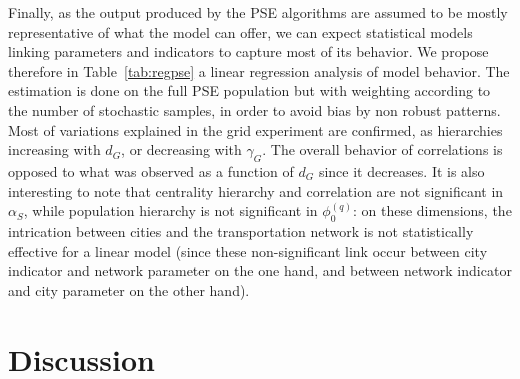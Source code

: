 \documentclass[11pt]{article}
\begin{document}
Finally, as the output produced by the PSE algorithms are assumed to be mostly representative of what the model can offer, we can expect statistical models linking parameters and indicators to capture most of its behavior. We propose therefore in Table~\ref{tab:regpse} a linear regression analysis of model behavior. The estimation is done on the full PSE population but with weighting according to the number of stochastic samples, in order to avoid bias by non robust patterns. Most of variations explained in the grid experiment are confirmed, as hierarchies increasing with $d_G$, or decreasing with $\gamma_G$. The overall behavior of correlations is opposed to what was observed as a function of $d_G$ since it decreases. It is also interesting to note that centrality hierarchy and correlation are not significant in $\alpha_S$, while population hierarchy is not significant in $\phi_0^{(q)}$: on these dimensions, the intrication between cities and the transportation network is not statistically effective for a linear model (since these non-significant link occur between city indicator and network parameter on the one hand, and between network indicator and city parameter on the other hand).







\section{Discussion}





% 
\end{document}
